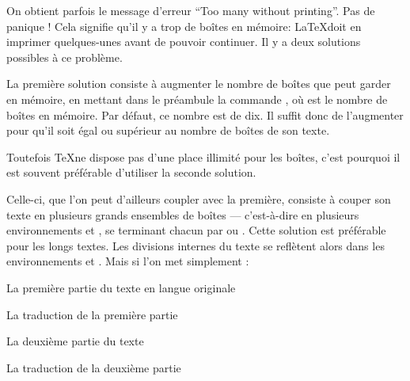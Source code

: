 {On obtient parfois le message d'erreur \enquote{Too many  without printing}. Pas de panique ! Cela signifie qu'il y a trop de boîtes en mémoire: \LaTeX  doit en imprimer quelques-unes avant de pouvoir continuer.  Il y a deux solutions possibles à ce problème.

La première solution consiste à  augmenter le nombre de boîtes que  peut garder en mémoire, en mettant dans le préambule la commande , où  est le nombre de boîtes en mémoire. Par défaut, ce nombre est de dix. Il suffit donc de l'augmenter  pour qu'il soit égal ou supérieur au nombre de boîtes de son  texte. 

Toutefois \TeX ne dispose pas d'une place illimité pour les boîtes, c'est pourquoi il est souvent préférable d'utiliser la seconde solution.


Celle-ci, que l'on peut d'ailleurs coupler avec la première, consiste à  couper son texte en plusieurs grands ensembles de boîtes --- c'est-à-dire en plusieurs environnements  et , se terminant chacun par  ou .  Cette solution est préférable pour les longs textes. Les divisions internes du texte se reflètent alors dans les environnements  et .   Mais si l'on met simplement :

\begin{latexcode}
\begin{pages}  
    \begin{Leftside}  \beginnumbering 
La première partie du texte en langue originale
    \endnumbering  \end{Leftside} 
 
    \begin{Rightside} \beginnumbering
La traduction de la première partie
    \endnumbering \end{Rightside} 
 \Pages
 
    \begin{Leftside} \beginnumbering  
La deuxième partie du texte 
    \endnumbering  \end{Leftside} 
 
    \begin{Rightside}  \beginnumbering
La traduction de la deuxième partie
    \endnumbering \end{Rightside} 
 \Pages

  \end{pages}
\end{latexcode}

}
